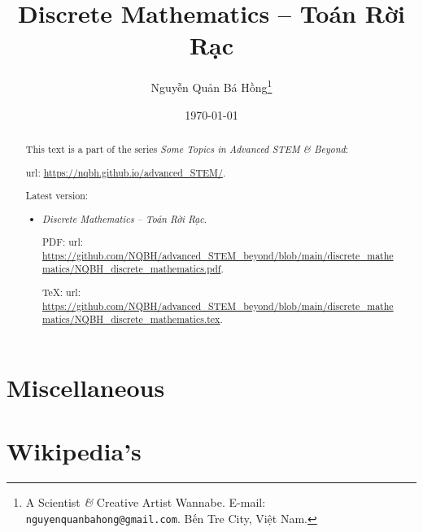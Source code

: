 \documentclass{article}
\title{Discrete Mathematics -- Toán Rời Rạc}
\author{Nguyễn Quản Bá Hồng\footnote{A Scientist {\it\&} Creative Artist Wannabe. E-mail: {\tt nguyenquanbahong@gmail.com}. Bến Tre City, Việt Nam.}}
\date{\today}
\begin{document}
\maketitle
\begin{abstract}
	This text is a part of the series {\it Some Topics in Advanced STEM \& Beyond}:
	
	{\sc url}: \url{https://nqbh.github.io/advanced_STEM/}.
	
	Latest version:
	\begin{itemize}
		\item {\it Discrete Mathematics -- Toán Rời Rạc}.
		
		PDF: {\sc url}: \url{https://github.com/NQBH/advanced_STEM_beyond/blob/main/discrete_mathematics/NQBH_discrete_mathematics.pdf}.
		
		\TeX: {\sc url}: \url{https://github.com/NQBH/advanced_STEM_beyond/blob/main/discrete_mathematics/NQBH_discrete_mathematics.tex}.
	\end{itemize}
\end{abstract}
\tableofcontents


\section{}


\section{Miscellaneous}


\section{Wikipedia's}
\end{document}

